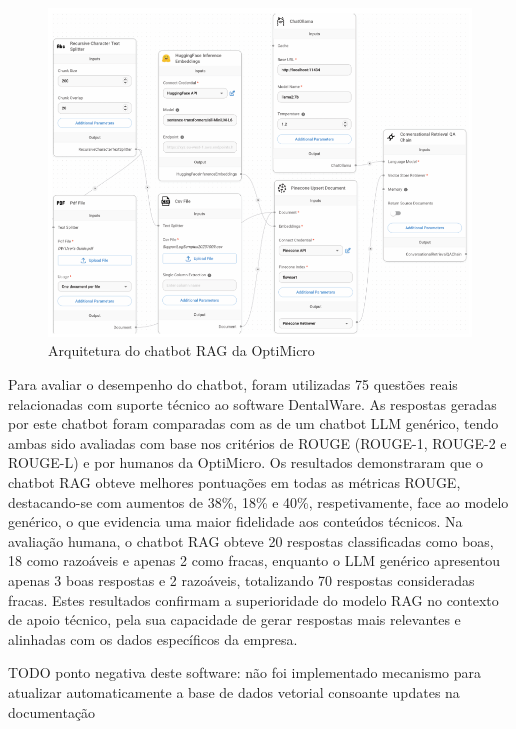 \begin{figure}[H]
        \centering
        \includegraphics[width=1\linewidth]{ch3/assets/optimicro-arch.png}
        \caption{Arquitetura do chatbot RAG da OptiMicro \parencite{lee2024development}}
        \label{fig:opti-micro-arch}
\end{figure}


Para avaliar o desempenho do chatbot, foram utilizadas 75 questões reais relacionadas com suporte técnico ao software DentalWare. As respostas geradas por este chatbot foram comparadas com as de um chatbot LLM genérico, tendo ambas sido avaliadas com base nos critérios de ROUGE (ROUGE-1, ROUGE-2 e ROUGE-L) e por humanos da OptiMicro. Os resultados demonstraram que o chatbot RAG obteve melhores pontuações em todas as métricas ROUGE, destacando-se com aumentos de 38\%, 18\% e 40\%, respetivamente, face ao modelo genérico, o que evidencia uma maior fidelidade aos conteúdos técnicos. Na avaliação humana, o chatbot RAG obteve 20 respostas classificadas como boas, 18 como razoáveis e apenas 2 como fracas, enquanto o LLM genérico apresentou apenas 3 boas respostas e 2 razoáveis, totalizando 70 respostas consideradas fracas. Estes resultados confirmam a superioridade do modelo RAG no contexto de apoio técnico, pela sua capacidade de gerar respostas mais relevantes e alinhadas com os dados específicos da empresa.



TODO ponto negativa deste software: não foi implementado mecanismo para atualizar automaticamente a base de dados vetorial consoante updates na documentação


